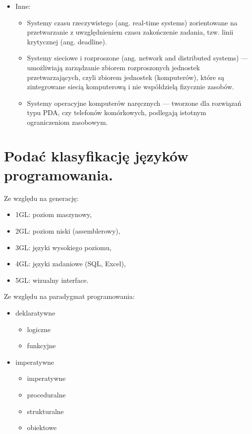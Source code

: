 \documentclass[12pt,a4paper]{article}
\begin{document}
\begin{itemize}
		\item Inne:
		\begin{itemize}
			\item Systemy czasu rzeczywistego (ang. real-time systems) zorientowane na przetwarzanie z uwzględnieniem czasu zakończenie zadania, tzw. linii krytycznej (ang. deadline).
			\item Systemy sieciowe i rozproszone (ang. network and distributed systems) — umożliwiają zarządzanie zbiorem rozproszonych jednostek przetwarzających, czyli zbiorem jednostek (komputerów), które są zintegrowane siecią komputerową i nie współdzielą fizycznie zasobów.
			\item Systemy operacyjne komputerów naręcznych — tworzone dla rozwiązań typu PDA, czy telefonów komórkowych, podlegają istotnym ograniczeniom zasobowym.
		\end{itemize}
	\end{itemize}

	\section{Podać klasyfikację języków programowania.}
	Ze względu na generację:	
	\begin{itemize}
		\item 1GL: poziom maszynowy,
		\item 2GL: poziom niski (assemblerowy),
		\item 3GL: języki wysokiego poziomu,
		\item 4GL: języki zadaniowe (SQL, Excel), 
		\item 5GL: wizualny interface.
	\end{itemize}

	Ze względu na paradygmat programowania:	
	\begin{itemize}
		\item deklaratywne
		\begin{itemize}
			\item logiczne
			\item funkcyjne
		\end{itemize}
		\item imperatywne
		\begin{itemize}
			\item imperatywne
			\item proceduralne
			\item strukturalne
			\item obiektowe
		\end{itemize}
	\end{itemize}
	
\end{document}
